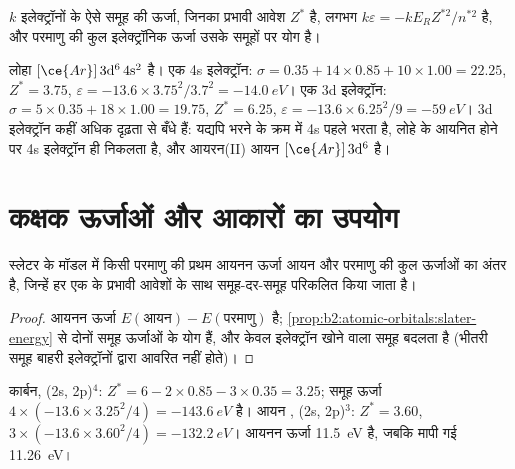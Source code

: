 \begin{proposition}[स्लेटर ऊर्जाएँ]\label{prop:b2:atomic-orbitals:slater-energy}
$k$ इलेक्ट्रॉनों के ऐसे समूह की ऊर्जा, जिनका प्रभावी आवेश $Z^*$ है, लगभग
$k\varepsilon = -kE_RZ^{*2}/n^{*2}$ है, और परमाणु की कुल इलेक्ट्रॉनिक ऊर्जा
उसके समूहों पर योग है।
\end{proposition}

\admitted

\begin{example}[लोहा: पहले 4s या 3d?]\label{ex:b2:atomic-orbitals:iron}
लोहा $[\ce{Ar}]\,3\mathrm d^6\,4\mathrm s^2$ है। एक 4s इलेक्ट्रॉन: $\sigma = 0.35 + 14
\times 0.85 + 10 \times 1.00 = 22.25$, $Z^* = 3.75$, $\varepsilon = -13.6 \times
3.75^2/3.7^2 = \qty{-14.0}{eV}$। एक 3d इलेक्ट्रॉन: $\sigma = 5 \times 0.35 + 18 \times 1.00 =
19.75$, $Z^* = 6.25$, $\varepsilon = -13.6 \times 6.25^2/9 = \qty{-59}{eV}$। 3d
इलेक्ट्रॉन कहीं अधिक दृढ़ता से बँधे हैं: यद्यपि भरने के क्रम में 4s पहले भरता है,
लोहे के आयनित होने पर 4s इलेक्ट्रॉन ही निकलता है, और
आयरन(II) आयन $[\ce{Ar}]\,3\mathrm d^6$ है।
\end{example}

\section{कक्षक ऊर्जाओं और आकारों का उपयोग}

\begin{proposition}[स्लेटर ऊर्जाओं से आयनन ऊर्जा]\label{prop:b2:atomic-orbitals:ionisation}
स्लेटर के मॉडल में किसी परमाणु की प्रथम आयनन ऊर्जा आयन और परमाणु की
कुल ऊर्जाओं का अंतर है, जिन्हें हर एक के प्रभावी आवेशों के साथ समूह-दर-समूह
परिकलित किया जाता है।
\end{proposition}

\begin{proof}
आयनन ऊर्जा $E(\text{आयन}) - E(\text{परमाणु})$ है;
\cref{prop:b2:atomic-orbitals:slater-energy} से दोनों समूह ऊर्जाओं के योग हैं, और
केवल इलेक्ट्रॉन खोने वाला समूह बदलता है (भीतरी समूह
बाहरी इलेक्ट्रॉनों द्वारा आवरित नहीं होते)।
\end{proof}

\begin{example}[कार्बन]\label{ex:b2:atomic-orbitals:carbon}
कार्बन, (2s, 2p)$^4$: $Z^* = 6 - 2 \times 0.85 - 3 \times 0.35 = 3.25$; समूह ऊर्जा
$4 \times (-13.6 \times 3.25^2/4) = \qty{-143.6}{eV}$ है। आयन , (2s, 2p)$^3$: $Z^* =
3.60$, $3 \times (-13.6 \times 3.60^2/4) = \qty{-132.2}{eV}$। आयनन ऊर्जा
\qty{11.5}{eV} है, जबकि मापी गई \qty{11.26}{eV}।
\end{example}

